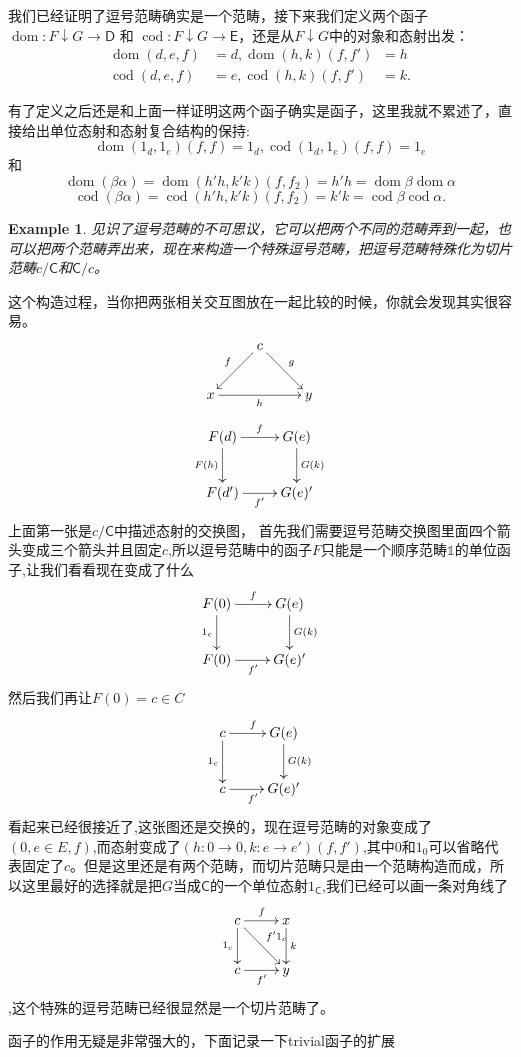 \documentclass{article}
\newtheorem{example}[theorem]{Example}
\newcommand{\sC}{\mathsf{C}}
\newcommand{\sD}{\mathsf{D}}
\newcommand{\sE}{\mathsf{E}}
\newcommand{\al}{\alpha}
\newcommand{\be}{\beta}
\newcommand*{\xfunc}[4]{{#2}\colon{#3}{#1}{#4}}
\newcommand*{\func}[3]{\xfunc{\to}{#1}{#2}{#3}}
\newcommand*{\qty}[1]{\left({#1}\right)}
\DeclareMathOperator{\dom}{dom}
\DeclareMathOperator{\cod}{cod}
\begin{document}
我们已经证明了逗号范畴确实是一个范畴，接下来我们定义两个函子$\func{\dom}{F \downarrow G}{\sD}$ 和 $\func{\cod}{F \downarrow G}{\sE}$，还是从$F \downarrow G$中的对象和态射出发：
\begin{align*}
	\dom\qty{d,e,f} &= d, \dom\qty{h,k}\qty{f,f'} \;\;= h \\
	\cod\qty{d,e,f} &= e, \cod\qty{h,k}\qty{f,f'} \quad= k.
\end{align*}

有了定义之后还是和上面一样证明这两个函子确实是函子，这里我就不累述了，直接给出单位态射和态射复合结构的保持:\[\dom\qty{1_{d},1_{e}}\qty{f,f} = 1_d,\cod\qty{1_{d},1_{e}}\qty{f,f} =1_e \]和\[\dom(\be \al) = \dom\qty{h'  h,k'  k}\qty{f,f_2} =h'
	 h = \dom\be  \dom\al\] \[\cod(\be \al) = \cod \qty{h' h,k' k}\qty{f,f_2}=  k'
	 k = \cod\be\cod\al.\]
	 
\begin{example}
见识了逗号范畴的不可思议，它可以把两个不同的范畴弄到一起，也可以把两个范畴弄出来，现在来构造一个特殊逗号范畴，把逗号范畴特殊化为切片范畴$c/\sC$和$\sC/c$。
\end{example}

这个构造过程，当你把两张相关交互图放在一起比较的时候，你就会发现其实很容易。
\[ \xymatrix{&c\ar[dr]^g
		\ar[dl]_f& \\ x \ar[rr]_h && y } \] \[\xymatrix{
					F(d) \ar[d]_{F(h)} \ar[r]^{f} & G(e)\ar[d]^{G(k)}  \\
			F(d')\ar[r]_{f'} &G(e)'}\]上面第一张是$c/\sC$中描述态射的交换图，	 首先我们需要逗号范畴交换图里面四个箭头变成三个箭头并且固定$c$,所以逗号范畴中的函子$F$只能是一个顺序范畴$\mathbb{1}$的单位函子,让我们看看现在变成了什么\[\xymatrix{F(0) \ar[d]_{1_c} \ar[r]^{f} & G(e)\ar[d]^{G(k)}  \\F(0)\ar[r]_{f'} &G(e)'}\]然后我们再让$F(0)=c \in C$ \[\xymatrix{c \ar[d]_{1_c} \ar[r]^{f} & G(e)\ar[d]^{G(k)}  \\c\ar[r]_{f'} &G(e)'}\]看起来已经很接近了,这张图还是交换的，现在逗号范畴的对象变成了$\qty{0,e \in E,f}$,而态射变成了$\qty{\func{h}{0}{0},\func{k}{e}{e'}}(f,f')$,其中$0$和$1_0$可以省略代表固定了$c$。但是这里还是有两个范畴，而切片范畴只是由一个范畴构造而成，所以这里最好的选择就是把$G$当成$\sC$的一个单位态射$1_{\sC}$,我们已经可以画一条对角线了\[\xymatrix{c \ar[d]_{1_c} \ar[r]^{f} \ar[rd]^{f'1_c} & x\ar[d]^{k}  \\c\ar[r]_{f'} &y}\],这个特殊的逗号范畴已经很显然是一个切片范畴了。
			

函子的作用无疑是非常强大的，下面记录一下trivial函子的扩展
\end{document}
